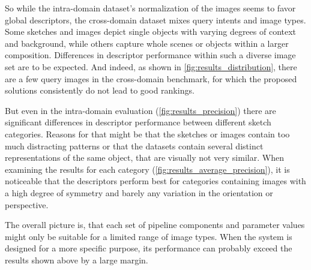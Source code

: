So while the intra-domain dataset's normalization of the images seems to favor
global descriptors, the cross-domain dataset mixes query intents and image
types. Some sketches and images depict single objects with varying degrees of
context and background, while others capture whole scenes or objects within a
larger composition. Differences in descriptor performance within such a diverse
image set are to be expected. And indeed, as shown in
\autoref{fig:results_distribution}, there are a few query images in the
cross-domain benchmark, for which the proposed solutions consistently do not
lead to good rankings. 

But even in the intra-domain evaluation (\autoref{fig:results_precision})
there are significant differences in descriptor performance between different
sketch categories. Reasons for that might be that the sketches or images
contain too much distracting patterns or that the datasets contain several
distinct representations of the same object, that are visually not very
similar. When examining the results for each category
(\autoref{fig:results_average_precision}), it is noticeable that the
descriptors perform best for categories containing images with a high degree of
symmetry and barely any variation in the orientation or perspective.

The overall picture is, that each set of pipeline components and parameter
values might only be suitable for a limited range of image types. When the
system is designed for a more specific purpose, its performance can probably
exceed the results shown above by a large margin.
